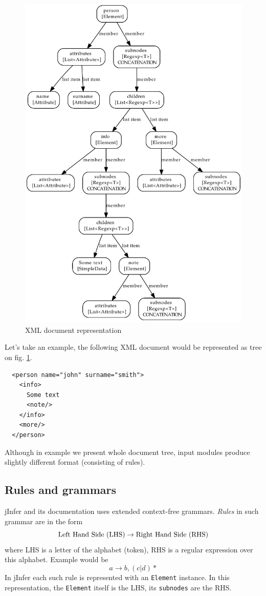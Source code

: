 \documentclass[a4paper,10pt,oneside]{article}
\newcommand{\myscale}{0.74}
\newcommand{\code}[1]{\texttt{#1}}
\begin{document}
\begin{figure}
\centering\includegraphics[scale=\myscale]{xml_example}
\caption{XML document representation} \label{xml_example}
\end{figure}
Let's take an example, the following XML document would be represented as tree on fig. \ref{xml_example}.
\begin{verbatim}
  <person name="john" surname="smith">
    <info>
      Some text
      <note/>
    </info>
    <more/>
  </person>
\end{verbatim} 
Although in example we present whole document tree, input modules produce slightly different format (consisting of rules).

\subsection{Rules and grammars} \label{rules_grammar}
jInfer and its documentation uses extended context-free grammars\cite{extendedcfg}.
\emph{Rules} in such grammar are in the form
$$
  \textnormal{Left Hand Side (LHS)} \to \textnormal{Right Hand Side (RHS)}
$$
where LHS is a letter of the alphabet (token), RHS is a regular expression over this alphabet. Example would be
$$
  a \to b, (c | d)\ast
$$
In jInfer each such rule is represented with an \code{Element} instance. In this representation, the \code{Element} itself is the LHS, its \code{subnodes} are the RHS.
\end{document}
